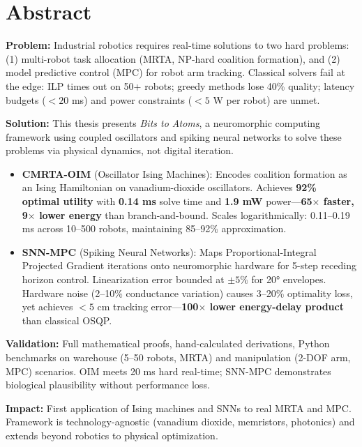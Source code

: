\chapter*{Abstract}

\textbf{Problem:} Industrial robotics requires real-time solutions to two hard problems: (1) multi-robot task allocation (MRTA, NP-hard coalition formation), and (2) model predictive control (MPC) for robot arm tracking. Classical solvers fail at the edge: ILP times out on 50+ robots; greedy methods lose 40\% quality; latency budgets ($< 20$ ms) and power constraints ($< 5$ W per robot) are unmet.

\textbf{Solution:} This thesis presents \textit{Bits to Atoms}, a neuromorphic computing framework using coupled oscillators and spiking neural networks to solve these problems via physical dynamics, not digital iteration.

\begin{itemize}[leftmargin=1.5em, itemsep=0.3em]
\item \textbf{CMRTA-OIM} (Oscillator Ising Machines): Encodes coalition formation as an Ising Hamiltonian on vanadium-dioxide oscillators. Achieves \textbf{92\% optimal utility} with \textbf{0.14 ms} solve time and \textbf{1.9 mW} power—\textbf{65$\times$ faster, 9$\times$ lower energy} than branch-and-bound. Scales logarithmically: 0.11--0.19 ms across 10--500 robots, maintaining 85--92\% approximation.

\item \textbf{SNN-MPC} (Spiking Neural Networks): Maps Proportional-Integral Projected Gradient iterations onto neuromorphic hardware for 5-step receding horizon control. Linearization error bounded at $\pm 5\%$ for 20° envelopes. Hardware noise (2--10\% conductance variation) causes 3--20\% optimality loss, yet achieves $< 5$ cm tracking error—\textbf{100$\times$ lower energy-delay product} than classical OSQP.
\end{itemize}

\textbf{Validation:} Full mathematical proofs, hand-calculated derivations, Python benchmarks on warehouse (5--50 robots, MRTA) and manipulation (2-DOF arm, MPC) scenarios. OIM meets 20 ms hard real-time; SNN-MPC demonstrates biological plausibility without performance loss.

\textbf{Impact:} First application of Ising machines and SNNs to real MRTA and MPC. Framework is technology-agnostic (vanadium dioxide, memristors, photonics) and extends beyond robotics to physical optimization.

